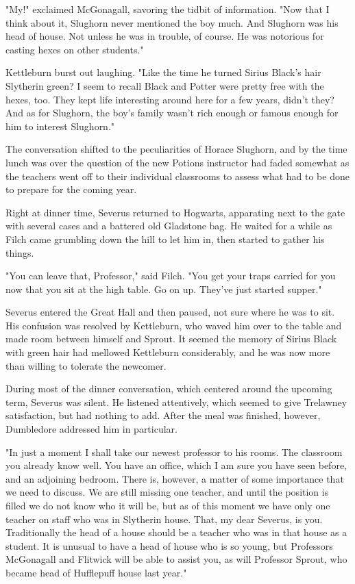 "My!" exclaimed McGonagall, savoring the tidbit of information. "Now that I think about it, Slughorn never mentioned the boy much. And Slughorn was his head of house. Not unless he was in trouble, of course. He was notorious for casting hexes on other students."

Kettleburn burst out laughing. "Like the time he turned Sirius Black's hair Slytherin green? I seem to recall Black and Potter were pretty free with the hexes, too. They kept life interesting around here for a few years, didn't they? And as for Slughorn, the boy's family wasn't rich enough or famous enough for him to interest Slughorn."

The conversation shifted to the peculiarities of Horace Slughorn, and by the time lunch was over the question of the new Potions instructor had faded somewhat as the teachers went off to their individual classrooms to assess what had to be done to prepare for the coming year.

Right at dinner time, Severus returned to Hogwarts, apparating next to the gate with several cases and a battered old Gladstone bag. He waited for a while as Filch came grumbling down the hill to let him in, then started to gather his things.

"You can leave that, Professor," said Filch. "You get your traps carried for you now that you sit at the high table. Go on up. They've just started supper."

Severus entered the Great Hall and then paused, not sure where he was to sit. His confusion was resolved by Kettleburn, who waved him over to the table and made room between himself and Sprout. It seemed the memory of Sirius Black with green hair had mellowed Kettleburn considerably, and he was now more than willing to tolerate the newcomer.

During most of the dinner conversation, which centered around the upcoming term, Severus was silent. He listened attentively, which seemed to give Trelawney satisfaction, but had nothing to add. After the meal was finished, however, Dumbledore addressed him in particular.

"In just a moment I shall take our newest professor to his rooms. The classroom you already know well. You have an office, which I am sure you have seen before, and an adjoining bedroom. There is, however, a matter of some importance that we need to discuss. We are still missing one teacher, and until the position is filled we do not know who it will be, but as of this moment we have only one teacher on staff who was in Slytherin house. That, my dear Severus, is you. Traditionally the head of a house should be a teacher who was in that house as a student. It is unusual to have a head of house who is so young, but Professors McGonagall and Flitwick will be able to assist you, as will Professor Sprout, who became head of Hufflepuff house last year."

